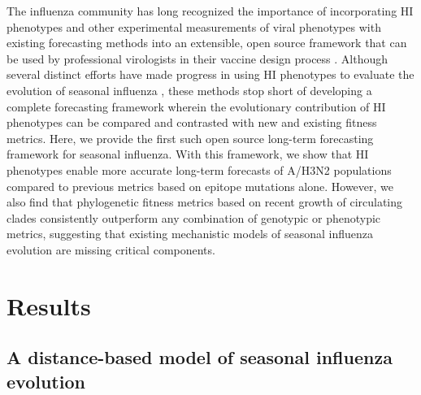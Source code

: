 The influenza community has long recognized the importance of incorporating HI phenotypes and other experimental measurements of viral phenotypes with existing forecasting methods into an extensible, open source framework that can be used by professional virologists in their vaccine design process \cite{Gandon:2016gz,Morris:2017ea,Lassig:2017hr}.
Although several distinct efforts have made progress in using HI phenotypes to evaluate the evolution of seasonal influenza \cite{Steinbruck:2014kq,Neher:2016hy}, these methods stop short of developing a complete forecasting framework wherein the evolutionary contribution of HI phenotypes can be compared and contrasted with new and existing fitness metrics.
Here, we provide the first such open source long-term forecasting framework for seasonal influenza.
With this framework, we show that HI phenotypes enable more accurate long-term forecasts of A/H3N2 populations compared to previous metrics based on epitope mutations alone.
However, we also find that phylogenetic fitness metrics based on recent growth of circulating clades consistently outperform any combination of genotypic or phenotypic metrics, suggesting that existing mechanistic models of seasonal influenza evolution are missing critical components.

\section*{Results}

\subsection*{A distance-based model of seasonal influenza evolution}

